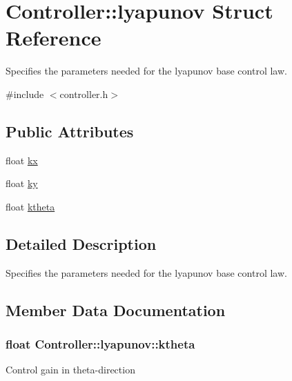 \hypertarget{structController_1_1lyapunov}{}\section{Controller\+:\+:lyapunov Struct Reference}
\label{structController_1_1lyapunov}


Specifies the parameters needed for the lyapunov base control law.  




{\ttfamily \#include $<$controller.\+h$>$}

\subsection*{Public Attributes}
\begin{DoxyCompactItemize}
\item 
float \hyperlink{structController_1_1lyapunov_a56b832234c79347ed03bdfa1f88aa530}{kx}
\item 
float \hyperlink{structController_1_1lyapunov_a3790be122f461506e1b7a30d8a2316a4}{ky}
\item 
float \hyperlink{structController_1_1lyapunov_acfdb5c6549627067f54273b7fbc6ac2b}{ktheta}
\end{DoxyCompactItemize}


\subsection{Detailed Description}
Specifies the parameters needed for the lyapunov base control law. 

\subsection{Member Data Documentation}
\subsubsection[{\texorpdfstring{ktheta}{ktheta}}]{\setlength{\rightskip}{0pt plus 5cm}float Controller\+::lyapunov\+::ktheta}\hypertarget{structController_1_1lyapunov_acfdb5c6549627067f54273b7fbc6ac2b}{}\label{structController_1_1lyapunov_acfdb5c6549627067f54273b7fbc6ac2b}
Control gain in theta-\/direction 
